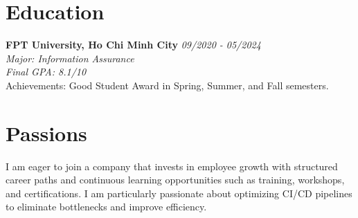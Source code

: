 \documentclass[a4paper,10pt]{article}
\begin{document}
\vspace{5pt}
\section*{Education}
\noindent \textbf{FPT University, Ho Chi Minh City} \hfill \textit{09/2020 - 05/2024} \\
\textit{Major: Information Assurance} \\
\textit{Final GPA: 8.1/10} \\
Achievements: Good Student Award in Spring, Summer, and Fall semesters.

\vspace{5pt}
\section*{Passions}
I am eager to join a company that invests in employee growth with structured career paths and continuous learning opportunities such as training, workshops, and certifications. I am particularly passionate about optimizing CI/CD pipelines to eliminate bottlenecks and improve efficiency.
\end{document}
